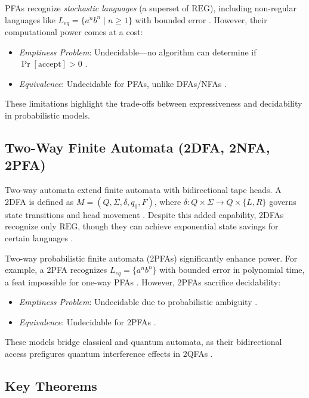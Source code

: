 PFAs recognize \textit{stochastic languages} (a superset of $\text{REG}$), including non-regular languages like $L_{eq} = \{a^n b^n \mid n \geq 1\}$ with bounded error \cite{rabin1963probabilistic}. However, their computational power comes at a cost:
\begin{itemize}
    \item \textit{Emptiness Problem}: Undecidable—no algorithm can determine if $\Pr[\text{accept}] > 0$ \cite{paz1971introduction}.
    \item \textit{Equivalence}: Undecidable for PFAs, unlike DFAs/NFAs \cite{paz1971introduction}.
\end{itemize} 

These limitations highlight the trade-offs between expressiveness and decidability in probabilistic models. 

\subsection{Two-Way Finite Automata (2DFA, 2NFA, 2PFA)}
\label{subsec:2dfa} 

Two-way automata extend finite automata with bidirectional tape heads. A 2DFA is defined as $M = (Q, \Sigma, \delta, q_0, F)$, where $\delta: Q \times \Sigma \to Q \times \{L, R\}$ governs state transitions and head movement \cite{kondacs1997power}. Despite this added capability, 2DFAs recognize only $\text{REG}$, though they can achieve exponential state savings for certain languages \cite{kondacs1997power}. 

Two-way probabilistic finite automata (2PFAs) significantly enhance power. For example, a 2PFA recognizes $L_{eq} = \{a^n b^n\}$ with bounded error in polynomial time, a feat impossible for one-way PFAs \cite{kondacs1997power}. However, 2PFAs sacrifice decidability:
\begin{itemize}
    \item \textit{Emptiness Problem}: Undecidable due to probabilistic ambiguity \cite{kondacs1997power}.
    \item \textit{Equivalence}: Undecidable for 2PFAs \cite{kondacs1997power}.
\end{itemize} 

These models bridge classical and quantum automata, as their bidirectional access prefigures quantum interference effects in 2QFAs \cite{ambainis2009superiority}. 

\subsection{Key Theorems}
\label{subsec:key-theorems} 


